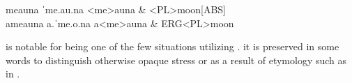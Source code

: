 \begin{subexamples}
  \ex
    \preamble meauna
    \pronunciation ˈme.au.na
    \gloss
      <me>auna & <PL>moon[ABS] \\
  \ex
    \preamble ameauna
    \pronunciation a.ˈme.o.na
    \gloss
      a\allo <me>auna & ERG\allo <PL>moon \\
\end{subexamples}

 is notable for being one of the few situations utilizing . it is preserved in some words to distinguish otherwise opaque stress or as a result of etymology such as in .
